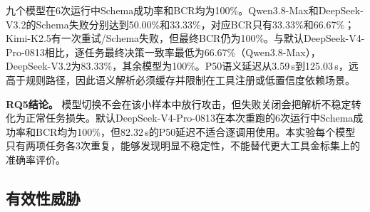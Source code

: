 \begin{table}[htbp]
    \centering
    \caption{不同语义模型的重复运行结果（每个模型6次）}
    \label{tab:rq5-models}
\end{table}

九个模型在6次运行中Schema成功率和BCR均为100\%。Qwen3.8-Max和DeepSeek-V3.2的Schema失败分别达到50.00\%和33.33\%，对应BCR只有33.33\%和66.67\%；Kimi-K2.5有一次重试/Schema失败，但最终BCR仍为100\%。与默认DeepSeek-V4-Pro-0813相比，逐任务最终决策一致率最低为66.67\%（Qwen3.8-Max），DeepSeek-V3.2为83.33\%，其余模型为100\%。P50语义延迟从3.59\,s到125.03\,s，远高于规则路径，因此语义解析必须缓存并限制在工具注册或低置信度依赖场景。

\textbf{RQ5结论。}
模型切换不会在该小样本中放行攻击，但失败关闭会把解析不稳定转化为正常任务损失。默认DeepSeek-V4-Pro-0813在本次重跑的6次运行中Schema成功率和BCR均为100\%，但82.32\,s的P50延迟不适合逐调用使用。本实验每个模型只有两项任务各3次重复，能够发现明显不稳定性，不能替代更大工具金标集上的准确率评价。


\subsection{有效性威胁}

